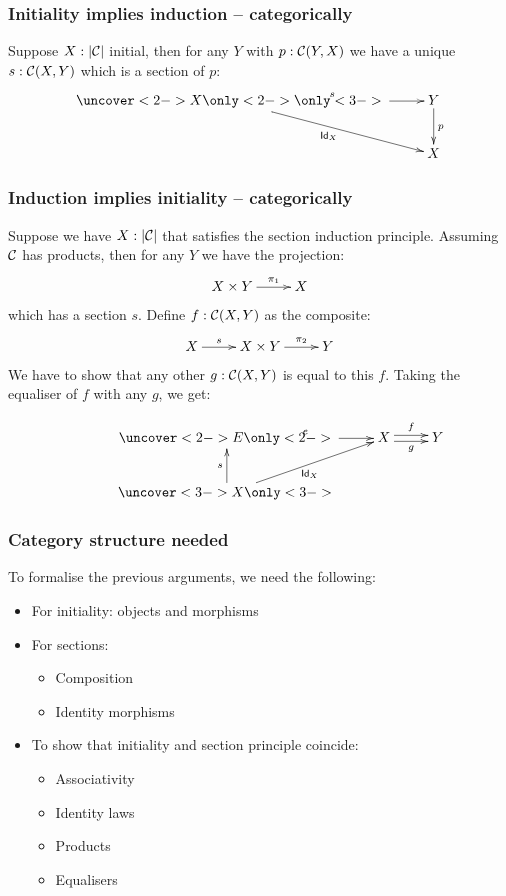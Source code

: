\documentclass{beamer}
\begin{document}
\begin{frame}
  \frametitle{Initiality implies induction -- categorically}
  
  Suppose $X : | \mathcal{C} |$ initial, then for any $Y$ with $p : \mathcal{C}(Y,X)$ we
  have a unique $s : \mathcal{C}(X,Y)$ which is a section of $p$:
  $$
  \xymatrix{
    \uncover<2->{X} \only<2->{\ar[r]^{s}} \only<3->{\ar[dr]_{\Id{X}}} &Y \ar[d]^{p} \\
    &X
  }
  $$

\end{frame}

\begin{frame}
  \frametitle{Induction implies initiality -- categorically}

  Suppose we have $X : | \mathcal{C} |$ that satisfies the section induction
  principle. Assuming $\mathcal{C}$ has products, then for any $Y$ we have the
  projection:
  $$
  \xymatrix{
    X \times Y \ar[r]^-{\pi_1} &X
  }
  $$
  which has a section $s$. Define $f : \mathcal{C}(X,Y)$ as the composite:
  $$
  \xymatrix{
    X \ar[r]^-{s} &X \times Y \ar[r]^-{\pi_2} &Y
  }
  $$
  We have to show that any other $g : \mathcal{C}(X,Y)$ is equal to this
  $f$. Taking the equaliser of $f$ with any $g$, we get:

  $$
  \xymatrix{ 
    &\uncover<2->{E} \only<2->{\ar[r]^{e}} &X \ar@<-.5ex>[r]_-{g} \ar@<.5ex>[r]^-{f} &Y \\
    &\uncover<3->{X} \only<3->{\ar[u]^{s} \ar[ur]_{\Id{X}}}
  }
  $$
\end{frame}

\begin{frame}
  \frametitle{Category structure needed}

  To formalise the previous arguments, we need the following:

  \begin{itemize}
  \item For initiality: objects and morphisms
  \item For sections:
    \begin{itemize}
    \item Composition
    \item Identity morphisms
    \end{itemize}
  \item To show that initiality and section principle coincide:
    \begin{itemize}
    \item Associativity
    \item Identity laws
    \item Products
    \item Equalisers
    \end{itemize}
  \end{itemize}

\end{frame}
\end{document}
